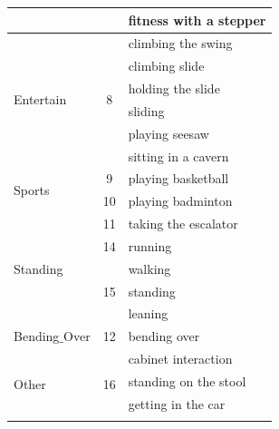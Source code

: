 \begin{appendix}
\begin{table}[ht]
{\begin{tabular}{l|c|l}
                                     &                     & fitness with a stepper             \\ \hline
\multirow{6}{*}{Entertain}           & \multirow{6}{*}{8}  & climbing the swing                 \\ \cline{3-3} 
                                     &                     & climbing slide                     \\ \cline{3-3} 
                                     &                     & holding the slide                  \\ \cline{3-3} 
                                     &                     & sliding                            \\ \cline{3-3} 
                                     &                     & playing seesaw                     \\ \cline{3-3} 
                                     &                     & sitting in a cavern                \\ \hline
\multirow{2}{*}{Sports}              & 9                   & playing basketball                 \\ \cline{2-3} 
                                     & 10                  & playing badminton                  \\ \hline
\multirow{5}{*}{Standing}            & 11                  & taking the escalator               \\ \cline{2-3} 
                                     & 14                  & running                            \\ \cline{2-3} 
                                     & \multirow{3}{*}{15} & walking                            \\ \cline{3-3} 
                                     &                     & standing                           \\ \cline{3-3} 
                                     &                     & leaning                            \\ \hline
Bending$\_$Over                         & 12                  & bending over                       \\ \hline
\multirow{8}{*}{Other}               & \multirow{8}{*}{16} & cabinet interaction                \\ \cline{3-3} 
                                     &                     & standing on the stool              \\ \cline{3-3} 
                                     &                     & getting in the car                 \\ \cline{3-3} 

\end{tabular}}
\end{table}
\end{appendix}
